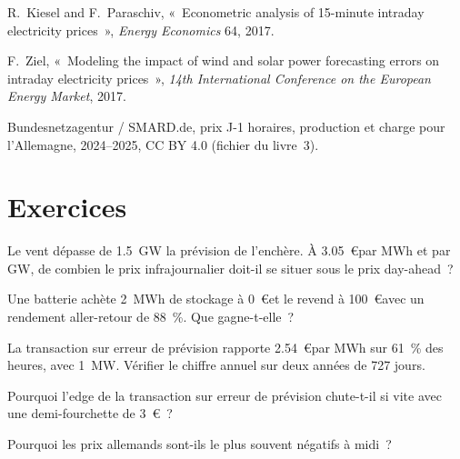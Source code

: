 \begin{omsources}
\item R.~Kiesel and F.~Paraschiv, «~Econometric analysis of 15-minute intraday electricity prices~», \emph{Energy Economics} 64, 2017.
\item F.~Ziel, «~Modeling the impact of wind and solar power forecasting errors on intraday electricity prices~», \emph{14th International Conference
on the European Energy Market}, 2017.
\item Bundesnetzagentur / SMARD.de, prix J-1 horaires, production et charge pour l'Allemagne, 2024--2025, CC BY 4.0 (fichier du livre~3).
\end{omsources}

\section{Exercices}

\begin{exercise}[$\star$]\label{exo:s2:power-and-gas-trading:1}
Le vent dépasse de 1.5~GW la prévision de l'enchère. À 3.05~\euro par MWh et par GW, de combien le prix infrajournalier doit-il se situer sous le prix day-ahead~?
\end{exercise}

\begin{exercise}[$\star$]\label{exo:s2:power-and-gas-trading:2}
Une batterie achète 2~MWh de stockage à 0~\euro et le revend à 100~\euro avec un rendement aller-retour de 88~\%. Que gagne-t-elle~?
\end{exercise}

\begin{exercise}[$\star$]\label{exo:s2:power-and-gas-trading:3}
La transaction sur erreur de prévision rapporte 2.54~\euro par MWh sur 61~\% des heures, avec 1~MW. Vérifier le chiffre annuel sur deux années de 727 jours.
\end{exercise}

\begin{exercise}[$\star\star$]\label{exo:s2:power-and-gas-trading:4}
Pourquoi l'edge de la transaction sur erreur de prévision chute-t-il si vite avec une demi-fourchette de 3~\euro~?
\end{exercise}

\begin{exercise}[$\star\star$]\label{exo:s2:power-and-gas-trading:5}
Pourquoi les prix allemands sont-ils le plus souvent négatifs à midi~?
\end{exercise}

